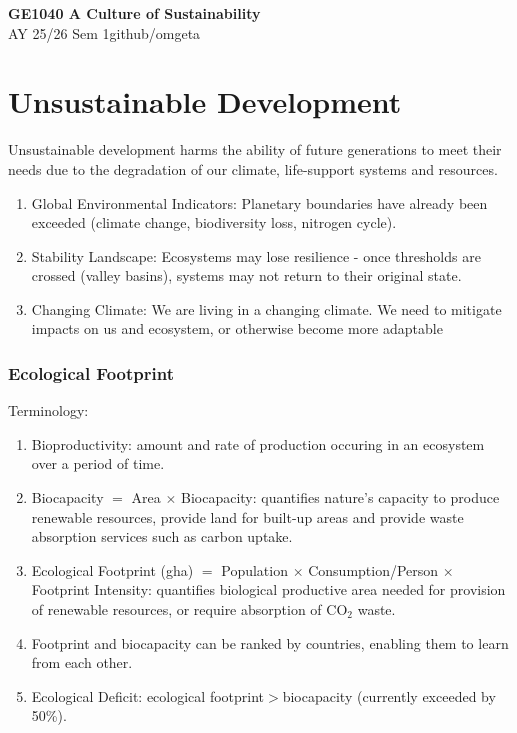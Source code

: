 \documentclass[12pt, a4paper]{article}
\newcommand{\mytitle}{GE1040 A Culture of Sustainability}
\newcommand{\myauthor}{github/omgeta}
\newcommand{\mydate}{AY 25/26 Sem 1}
\begin{document}
\raggedright
\footnotesize
\begin{multicols*}{3}
\setlength{\premulticols}{1pt}
\setlength{\postmulticols}{1pt}
\setlength{\multicolsep}{1pt}
\setlength{\columnsep}{2pt}

{\normalsize{\textbf{\mytitle}}} \\
{\footnotesize{\mydate\hspace{2pt}\textemdash\hspace{2pt}\myauthor}}
\vspace{-0.5em}
\section{Unsustainable Development}
Unsustainable development harms the ability of future generations to meet their needs due to the degradation of our climate, life-support systems and resources.
\begin{enumerate}[\roman*.]
  \item Global Environmental Indicators: Planetary boundaries have already been exceeded (climate change, biodiversity loss, nitrogen cycle).
  \item Stability Landscape: Ecosystems may lose resilience - once thresholds are crossed (valley basins), systems may not return to their original state.
  \item Changing Climate: We are living in a changing climate. We need to mitigate impacts on us and ecosystem, or otherwise become more adaptable
\end{enumerate}

\subsubsection{Ecological Footprint}

Terminology:
\begin{enumerate}[\roman*.]
  \item Bioproductivity: amount and rate of production occuring in an ecosystem over a period of time.
  \item Biocapacity $=$ Area $\times$ Biocapacity: quantifies nature's capacity to produce renewable resources, provide land for built-up areas and provide waste absorption services such as carbon uptake.
  \item Ecological Footprint (gha) $=$ Population $\times$ Consumption/Person $\times$ Footprint Intensity: quantifies biological productive area needed for provision of renewable resources, or require absorption of $\text{CO}_2$ waste.
  \item Footprint and biocapacity can be ranked by countries, enabling them to learn from each other. 
  \item Ecological Deficit: ecological footprint$>$biocapacity (currently exceeded by 50\%).
\end{enumerate}


\end{multicols*}
\end{document}
